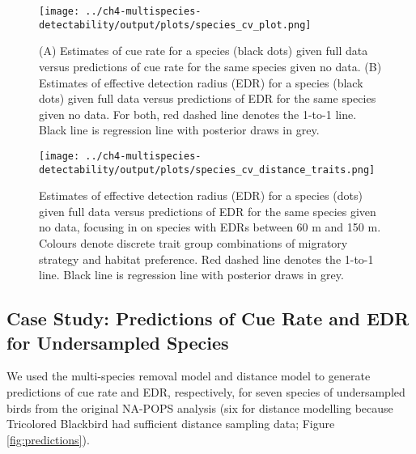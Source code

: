 \begin{figure}[h]
	\texttt{[image: ../ch4-multispecies-detectability/output/plots/species\_cv\_plot.png]}
	\caption{(A) Estimates of cue rate for a species (black dots) given full data versus predictions of cue rate for the same species given no data. (B) Estimates of effective detection radius (EDR) for a species (black dots) given full data versus predictions of EDR for the same species given no data. For both, red dashed line denotes the 1-to-1 line. Black line is regression line with posterior draws in grey.}
	\label{fig:species_cv}
\end{figure}

\begin{figure}[h]
	\texttt{[image: ../ch4-multispecies-detectability/output/plots/species\_cv\_distance\_traits.png]}
	\caption{Estimates of effective detection radius (EDR) for a species (dots) given full data versus predictions of EDR for the same species given no data, focusing in on species with EDRs between 60 m and 150 m. Colours denote discrete trait group combinations of migratory strategy and habitat preference. Red dashed line denotes the 1-to-1 line. Black line is regression line with posterior draws in grey.}
	\label{fig:distance_cv_traits}
\end{figure}


\subsection{Case Study: Predictions of Cue Rate and EDR for Undersampled Species}

\par We used the multi-species removal model and distance model to generate predictions of cue rate and EDR, respectively, for seven species of undersampled birds from the original NA-POPS analysis (six for distance modelling because Tricolored Blackbird had sufficient distance sampling data; Figure \ref{fig:predictions}).

